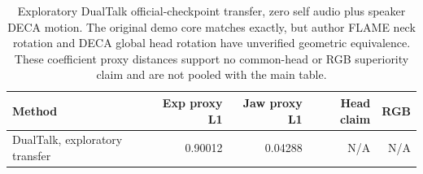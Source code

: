 \begin{table}[t]
\centering\small
\caption{Exploratory DualTalk official-checkpoint transfer, zero self audio plus speaker DECA motion. The original demo core matches exactly, but author FLAME neck rotation and DECA global head rotation have unverified geometric equivalence. These coefficient proxy distances support no common-head or RGB superiority claim and are not pooled with the main table.}
\label{tab:dualtalk-proxy}
\setlength{\tabcolsep}{4pt}
\begin{tabular}{lrrrr}
\toprule
Method & Exp proxy L1 & Jaw proxy L1 & Head claim & RGB \\
\midrule
DualTalk, exploratory transfer & 0.90012 & 0.04288 & N/A & N/A \\
\bottomrule
\end{tabular}
\end{table}
